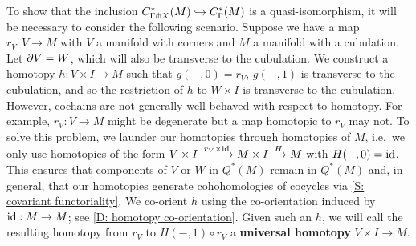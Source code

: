 To show that the inclusion $C^*_{\Gamma \pitchfork X}(M)\hookrightarrow C^*_\Gamma(M)$ is a quasi-isomorphism, it will be necessary to consider the following scenario. Suppose we have a map $r_V:V\to M$ with $V$ a manifold with corners and $M$ a manifold with a cubulation. Let $\partial V=W$, which will also be transverse to the cubulation. We construct a homotopy $h:V\times I\to M$ such that $g(-,0)=r_V$, $g(-,1)$ is transverse to the cubulation, and so the restriction of $h$ to $W\times I$ is transverse to the cubulation.
However, cochains are not generally well behaved with respect to homotopy. For example, $r_V:V\to M$ might be degenerate but a map homotopic to $r_V$ may not. To solve this problem, we launder our homotopies through homotopies of $M$, i.e.\ we only use homotopies of the form $V\times I\xrightarrow{r_V\times \mathrm{id}} M\times I\xrightarrow{H} M$ with $H(-,0)=\mathrm{id}$. This ensures that components of $V$ or $W$ in $Q^*(M)$ remain in $Q^*(M)$ and, in general, that our homotopies generate cohohomologies of cocycles via
\cref{S: covariant functoriality}. We co-orient $h$ using the co-orientation induced by $\mathrm{id}:M\to M$; see \cref{D: homotopy co-orientation}. Given such an $h$, we will call the resulting homotopy from $r_V$ to $H(-,1)\circ r_V$ a \textbf{universal homotopy} $V\times I\to M$.


